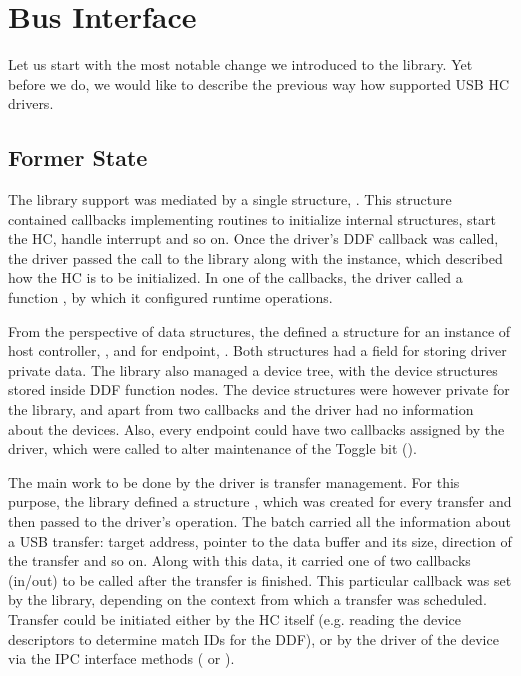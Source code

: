\section{Bus Interface}

Let us start with the most notable change we introduced to the 
library. Yet before we do, we would like to describe the previous way how
 supported USB HC drivers.

\subsection{Former State}

The library support was mediated by a single structure,
. This structure contained callbacks implementing
routines to initialize internal structures, start the HC, handle interrupt and
so on. Once the driver's DDF callback  was called, the driver
passed the call to the library along with the 
instance, which described how the HC is to be initialized. In one of the
callbacks, the driver called a function , by which
it configured runtime operations.

From the perspective of data structures, the  defined
a structure for an instance of host controller, , and for
endpoint, . Both structures had a field for storing driver
private data. The library also managed a device tree, with the device
structures stored inside DDF function nodes. The device structures were however
private for the library, and apart from two callbacks  and
 the driver had no information about the devices. Also,
every endpoint could have two callbacks assigned by the driver, which were
called to alter maintenance of the Toggle bit ().

The main work to be done by the driver is transfer management. For this
purpose, the library defined a structure , which
was created for every transfer and then passed to the driver's 
operation. The batch carried all the information about a USB transfer: target
address, pointer to the data buffer and its size, direction of the transfer and
so on. Along with this data, it carried one of two callbacks (in/out) to be
called after the transfer is finished. This particular callback was set by the
library, depending on the context from which a transfer was scheduled. Transfer
could be initiated either by the HC itself (e.g. reading the device descriptors
to determine match IDs for the DDF), or by the driver of the device via the IPC
interface methods ( or ).

